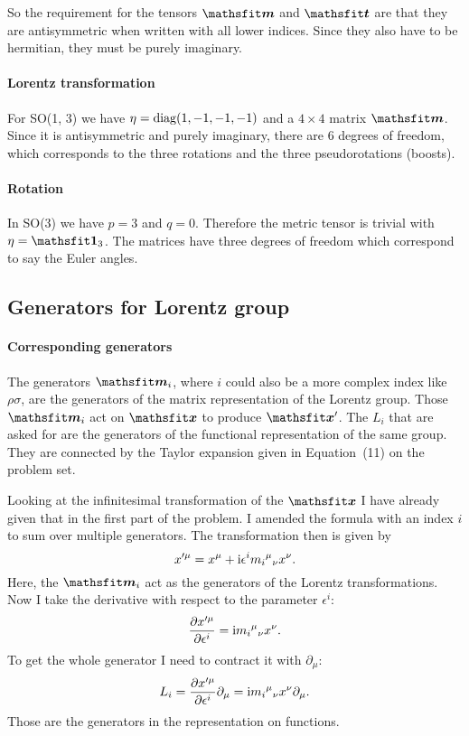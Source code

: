 \documentclass[11pt, english, fleqn, DIV=15, headinclude, BCOR=1cm]{scrartcl}
\begin{document}
So the requirement for the tensors $\tens m$ and $\tens t$ are that they are
antisymmetric when written with all lower indices. Since they also have to be
hermitian, they must be purely imaginary.

\paragraph{Lorentz transformation}

For SO(1, 3) we have $\eta = \operatorname{diag}(1, -1, -1, -1)$ and a $4\times 4$ matrix
$\tens m$. Since it is antisymmetric and purely imaginary, there are 6 degrees
of freedom, which corresponds to the three rotations and the three
pseudorotations (boosts).

\paragraph{Rotation}

In SO(3) we have $p = 3$ and $q = 0$. Therefore the metric tensor is trivial
with $\eta = \tens 1_3$. The matrices have three degrees of freedom which
correspond to say the Euler angles.

\subsection{Generators for Lorentz group}

\paragraph{Corresponding generators}

The generators $\tens m_i$, where $i$ could also be a more complex index like
$\rho\sigma$, are the generators of the matrix representation of the Lorentz
group. Those $\tens m_i$ act on $\tens x$ to produce $\tens x'$. The $L_i$ that
are asked for are the generators of the functional representation of the same
group. They are connected by the Taylor expansion given in Equation~(11) on the
problem set.

Looking at the infinitesimal transformation of the $\tens x$ I have already
given that in the first part of the problem. I amended the formula with an
index $i$ to sum over multiple generators. The transformation then is given by
\[
    x'^\mu = x^\mu + \mathrm i \epsilon^i m_i{}^\mu{}_\nu x^\nu.
\]
Here, the $\tens m_i$ act as the generators of the Lorentz transformations. Now
I take the derivative with respect to the parameter $\epsilon^i$:
\[
    \frac{\partial {x'^\mu}}{\partial {\epsilon^i}} = \mathrm i m_i{}^\mu{}_\nu x^\nu.
\]
To get the whole generator I need to contract it with $\partial_\mu$:
\[
    L_i = \frac{\partial {x'^\mu}}{\partial {\epsilon^i}} \partial_\mu
    = \mathrm i m_i{}^\mu{}_\nu x^\nu \partial_\mu.
\]
Those are the generators in the representation on functions.
\end{document}
